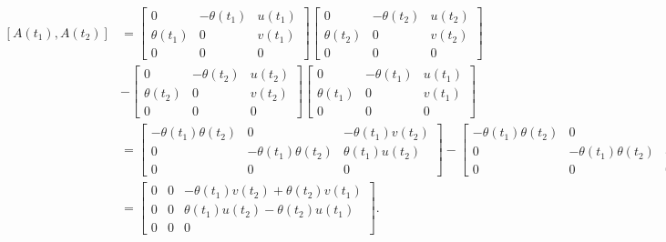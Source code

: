 \begin{equation*}
  \begin{aligned}
    \left[ A(t_1), A(t_2) \right] & = \begin{bmatrix}
      0 & -\theta(t_1) & u(t_1) \\ \theta(t_1) & 0 & v(t_1) \\ 0 & 0 & 0
    \end{bmatrix} \begin{bmatrix}
      0 & -\theta(t_2) & u(t_2) \\ \theta(t_2) & 0 & v(t_2) \\ 0 & 0 & 0
    \end{bmatrix}   \\
                                  & - \begin{bmatrix}
      0 & -\theta(t_2) & u(t_2) \\ \theta(t_2) & 0 & v(t_2) \\ 0 & 0 & 0
    \end{bmatrix} \begin{bmatrix}
      0 & -\theta(t_1) & u(t_1) \\ \theta(t_1) & 0 & v(t_1) \\ 0 & 0 & 0
    \end{bmatrix}   \\
                                  & = \begin{bmatrix}
      -\theta(t_1) \theta(t_2) & 0                        & -\theta(t_1)v(t_2) \\
      0                        & -\theta(t_1) \theta(t_2) & \theta(t_1)u(t_2)  \\
      0                        & 0                        & 0
    \end{bmatrix} - \begin{bmatrix}
      -\theta(t_1) \theta(t_2) & 0                        & -\theta(t_2) v(t_1) \\
      0                        & -\theta(t_1) \theta(t_2) & \theta(t_2) u(t_1)  \\
      0                        & 0                        & 0
    \end{bmatrix} \\
                                  & = \begin{bmatrix}
      0 & 0 & -\theta(t_1) v(t_2) + \theta(t_2) v(t_1) \\
      0 & 0 & \theta(t_1) u(t_2) - \theta(t_2) u(t_1)  \\
      0 & 0 & 0
    \end{bmatrix}.
  \end{aligned}
\end{equation*}

